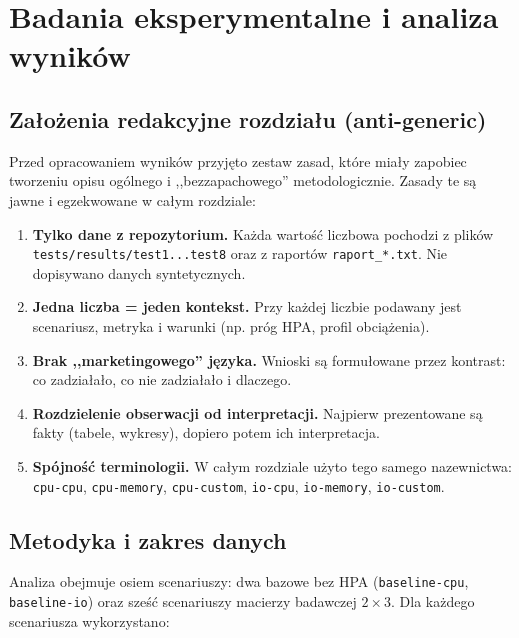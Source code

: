 \chapter{Badania eksperymentalne i analiza wyników}

\section{Założenia redakcyjne rozdziału (anti-generic)}

Przed opracowaniem wyników przyjęto zestaw zasad, które miały zapobiec tworzeniu opisu ogólnego i ,,bezzapachowego'' metodologicznie. Zasady te są jawne i egzekwowane w całym rozdziale:

\begin{enumerate}
  \item \textbf{Tylko dane z repozytorium.} Każda wartość liczbowa pochodzi z plików \texttt{tests/results/test1...test8} oraz z raportów \texttt{raport\_*.txt}. Nie dopisywano danych syntetycznych.
  \item \textbf{Jedna liczba = jeden kontekst.} Przy każdej liczbie podawany jest scenariusz, metryka i warunki (np. próg HPA, profil obciążenia).
  \item \textbf{Brak ,,marketingowego'' języka.} Wnioski są formułowane przez kontrast: co zadziałało, co nie zadziałało i dlaczego.
  \item \textbf{Rozdzielenie obserwacji od interpretacji.} Najpierw prezentowane są fakty (tabele, wykresy), dopiero potem ich interpretacja.
  \item \textbf{Spójność terminologii.} W całym rozdziale użyto tego samego nazewnictwa: \texttt{cpu-cpu}, \texttt{cpu-memory}, \texttt{cpu-custom}, \texttt{io-cpu}, \texttt{io-memory}, \texttt{io-custom}.
\end{enumerate}

\section{Metodyka i zakres danych}

Analiza obejmuje osiem scenariuszy: dwa bazowe bez HPA (\texttt{baseline-cpu}, \texttt{baseline-io}) oraz sześć scenariuszy macierzy badawczej $2\times3$. Dla każdego scenariusza wykorzystano:

